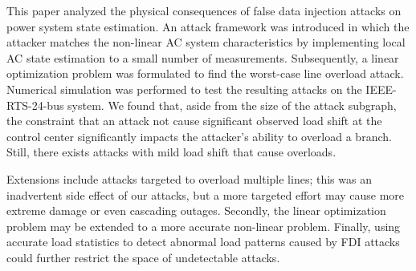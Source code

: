 \documentclass[twocolumn,english,final,journal]{IEEEtran}
\theoremstyle{plain}
\theoremstyle{definition}
\begin{document}
This paper analyzed the physical consequences of false data injection attacks on power system state estimation. An attack framework was introduced in which the attacker matches the non-linear AC system characteristics by implementing local AC state estimation to a small number of measurements. Subsequently, a linear optimization problem was formulated to find the worst-case line overload attack. Numerical simulation was performed to test the resulting attacks on the IEEE-RTS-24-bus system. We found that, aside from the size of the attack subgraph, the constraint that an attack not cause significant observed load shift at the control center significantly impacts the attacker's ability to overload a branch. Still, there exists attacks with mild load shift that cause overloads.

Extensions include attacks targeted to overload multiple lines; this was an inadvertent side effect of our attacks, but a more targeted effort may cause more extreme damage or even cascading outages. Secondly, the linear optimization problem may be extended to a more accurate non-linear problem. Finally, using accurate load statistics to detect abnormal load patterns caused by FDI attacks could further restrict the space of undetectable attacks.



\end{document}
